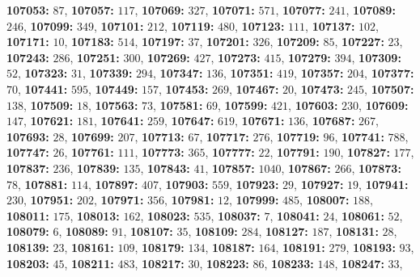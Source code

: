\textsf{\bfseries 107053:} $87$, \textsf{\bfseries 107057:} $117$, \textsf{\bfseries 107069:} $327$, \textsf{\bfseries 107071:} $571$, \textsf{\bfseries 107077:} $241$, \textsf{\bfseries 107089:} $246$, \textsf{\bfseries 107099:} $349$, \textsf{\bfseries 107101:} $212$, \textsf{\bfseries 107119:} $480$, \textsf{\bfseries 107123:} $111$, \textsf{\bfseries 107137:} $102$, \textsf{\bfseries 107171:} $10$, \textsf{\bfseries 107183:} $514$, \textsf{\bfseries 107197:} $37$, \textsf{\bfseries 107201:} $326$, \textsf{\bfseries 107209:} $85$, \textsf{\bfseries 107227:} $23$, \textsf{\bfseries 107243:} $286$, \textsf{\bfseries 107251:} $300$, \textsf{\bfseries 107269:} $427$, \textsf{\bfseries 107273:} $415$, 
\textsf{\bfseries 107279:} $394$, \textsf{\bfseries 107309:} $52$, \textsf{\bfseries 107323:} $31$, \textsf{\bfseries 107339:} $294$, \textsf{\bfseries 107347:} $136$, \textsf{\bfseries 107351:} $419$, \textsf{\bfseries 107357:} $204$, \textsf{\bfseries 107377:} $70$, \textsf{\bfseries 107441:} $595$, \textsf{\bfseries 107449:} $157$, \textsf{\bfseries 107453:} $269$, \textsf{\bfseries 107467:} $20$, \textsf{\bfseries 107473:} $245$, \textsf{\bfseries 107507:} $138$, \textsf{\bfseries 107509:} $18$, \textsf{\bfseries 107563:} $73$, \textsf{\bfseries 107581:} $69$, \textsf{\bfseries 107599:} $421$, \textsf{\bfseries 107603:} $230$, \textsf{\bfseries 107609:} $147$, \textsf{\bfseries 107621:} $181$, \textsf{\bfseries 107641:} $259$, \textsf{\bfseries 107647:} $619$, \textsf{\bfseries 107671:} $136$, \textsf{\bfseries 107687:} $267$, \textsf{\bfseries 107693:} $28$, \textsf{\bfseries 107699:} $207$, \textsf{\bfseries 107713:} $67$, \textsf{\bfseries 107717:} $276$, \textsf{\bfseries 107719:} $96$, \textsf{\bfseries 107741:} $788$, \textsf{\bfseries 107747:} $26$, \textsf{\bfseries 107761:} $111$, \textsf{\bfseries 107773:} $365$, \textsf{\bfseries 107777:} $22$, \textsf{\bfseries 107791:} $190$, \textsf{\bfseries 107827:} $177$, \textsf{\bfseries 107837:} $236$, \textsf{\bfseries 107839:} $135$, \textsf{\bfseries 107843:} $41$, \textsf{\bfseries 107857:} $1040$, \textsf{\bfseries 107867:} $266$, \textsf{\bfseries 107873:} $78$, \textsf{\bfseries 107881:} $114$, \textsf{\bfseries 107897:} $407$, \textsf{\bfseries 107903:} $559$, \textsf{\bfseries 107923:} $29$, \textsf{\bfseries 107927:} $19$, \textsf{\bfseries 107941:} $230$, \textsf{\bfseries 107951:} $202$, \textsf{\bfseries 107971:} $356$, \textsf{\bfseries 107981:} $12$, \textsf{\bfseries 107999:} $485$, \textsf{\bfseries 108007:} $188$, \textsf{\bfseries 108011:} $175$, \textsf{\bfseries 108013:} $162$, \textsf{\bfseries 108023:} $535$, \textsf{\bfseries 108037:} $7$, \textsf{\bfseries 108041:} $24$, \textsf{\bfseries 108061:} $52$, \textsf{\bfseries 108079:} $6$, \textsf{\bfseries 108089:} $91$, \textsf{\bfseries 108107:} $35$, \textsf{\bfseries 108109:} $284$, \textsf{\bfseries 108127:} $187$, \textsf{\bfseries 108131:} $28$, \textsf{\bfseries 108139:} $23$, \textsf{\bfseries 108161:} $109$, \textsf{\bfseries 108179:} $134$, \textsf{\bfseries 108187:} $164$, \textsf{\bfseries 108191:} $279$, \textsf{\bfseries 108193:} $93$, \textsf{\bfseries 108203:} $45$, \textsf{\bfseries 108211:} $483$, \textsf{\bfseries 108217:} $30$, \textsf{\bfseries 108223:} $86$, \textsf{\bfseries 108233:} $148$, \textsf{\bfseries 108247:} $33$, 